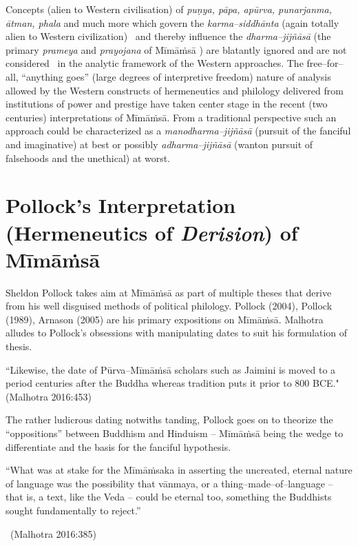 Concepts (alien to Western civilisation) of \textit{puṇya, pāpa, apūrva, punarjanma, ātman, phala} and much more which govern the \textit{karma–siddhānta} (again totally alien to Western civilization)  and thereby influence the \textit{dharma–jijñāsā} (the primary \textit{prameya} and \textit{prayojana} of Mīmāṁsā ) are blatantly ignored and are not considered  in the analytic framework of the Western approaches. The free–for–all, “anything goes” (large degrees of interpretive freedom) nature of analysis allowed by the Western constructs of hermeneutics and philology delivered from institutions of power and prestige have taken center stage in the recent (two centuries) interpretations of Mīmāṁsā. From a traditional perspective such an approach could be characterized as a \textit{manodharma–jijñāsā} (pursuit of the fanciful and imaginative) at best or possibly \textit{adharma–jijñāsā} (wanton pursuit of falsehoods and the unethical) at worst.


\section*{Pollock’s Interpretation (Hermeneutics of \textit{Derision}) of Mīmāṁsā}

Sheldon Pollock takes aim at Mīmāṁsā as part of multiple theses that derive from his well disguised methods of political philology. Pollock (2004), Pollock (1989), Arnason (2005) are his primary expositions on Mīmāṁsā. Malhotra alludes to Pollock’s obsessions with manipulating dates to suit his formulation of thesis.

\begin{myquote}
“Likewise, the date of Pūrva–Mīmāṁsā scholars such as Jaimini is moved to a period centuries after the Buddha whereas tradition puts it prior to 800 BCE."\hfill (Malhotra 2016:453)
\end{myquote}

The rather ludicrous dating notwiths tanding, Pollock goes on to theorize the “oppositions” between Buddhism and Hinduism – Mīmāṁsā being the wedge to differentiate and the basis for the fanciful hypothesis.

\begin{myquote}
“What was at stake for the Mīmāṁsaka in asserting the uncreated, eternal nature of language was the possibility that vānmaya, or a thing–made–of–language – that is, a text, like the Veda – could be eternal too, something the Buddhists sought fundamentally to reject.”

~\hfill (Malhotra 2016:385)
\end{myquote}

